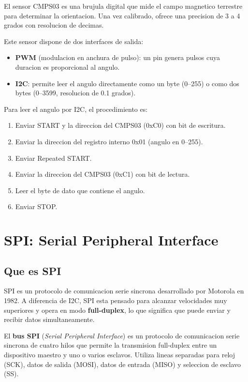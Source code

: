 El sensor CMPS03 es una brujula digital que mide el campo magnetico terrestre
para determinar la orientacion. Una vez calibrado, ofrece una precision de 3 a 4
grados con resolucion de decimas.

Este sensor dispone de dos interfaces de salida:
\begin{itemize}
    \item \textbf{PWM} (modulacion en anchura de pulso): un pin genera pulsos cuya
    duracion es proporcional al angulo.
    \item \textbf{I2C}: permite leer el angulo directamente como un byte (0--255)
    o como dos bytes (0--3599, resolucion de 0.1 grados).
\end{itemize}

Para leer el angulo por I2C, el procedimiento es:
\begin{enumerate}
    \item Enviar START y la direccion del CMPS03 (0xC0) con bit de escritura.
    \item Enviar la direccion del registro interno 0x01 (angulo en 0--255).
    \item Enviar Repeated START.
    \item Enviar la direccion del CMPS03 (0xC1) con bit de lectura.
    \item Leer el byte de dato que contiene el angulo.
    \item Enviar STOP.
\end{enumerate}


\section{SPI: Serial Peripheral Interface}

\subsection{Que es SPI}

SPI es un protocolo de comunicacion serie sincrona desarrollado por Motorola en
1982. A diferencia de I2C, SPI esta pensado para alcanzar velocidades muy
superiores y opera en modo \textbf{full-duplex}, lo que significa que puede enviar
y recibir datos simultaneamente.

\begin{definicion}[SPI]
El \textbf{bus SPI} (\textit{Serial Peripheral Interface}) es un protocolo de
comunicacion serie sincrona de cuatro hilos que permite la transmision full-duplex
entre un dispositivo maestro y uno o varios esclavos. Utiliza lineas separadas
para reloj (SCK), datos de salida (MOSI), datos de entrada (MISO) y seleccion de
esclavo (SS).
\end{definicion}

